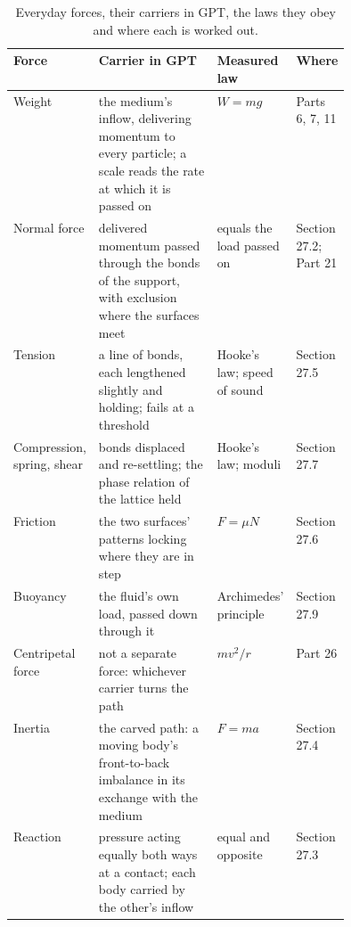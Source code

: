 \documentclass[11pt,a4paper]{article}
\begin{document}
\begin{table}[t]\centering\small
\caption{Everyday forces, their carriers in GPT, the laws they obey and where each is worked out.}
\begin{tabularx}{\linewidth}{@{}>{\raggedright}p{0.15\linewidth} X >{\raggedright}p{0.16\linewidth} >{\raggedright\arraybackslash}p{0.13\linewidth}@{}}\toprule
\textbf{Force} & \textbf{Carrier in GPT} & \textbf{Measured law} & \textbf{Where}\\\midrule
Weight & the medium's inflow, delivering momentum to every particle; a scale reads the rate at which it is passed on & $W=mg$ & Parts 6, 7, 11\\
Normal force & delivered momentum passed through the bonds of the support, with exclusion where the surfaces meet & equals the load passed on & Section 27.2; Part 21\\
Tension & a line of bonds, each lengthened slightly and holding; fails at a threshold & Hooke's law; speed of sound & Section 27.5\\
Compression, spring, shear & bonds displaced and re-settling; the phase relation of the lattice held & Hooke's law; moduli & Section 27.7\\
Friction & the two surfaces' patterns locking where they are in step & $F=\mu N$ & Section 27.6\\
Buoyancy & the fluid's own load, passed down through it & Archimedes' principle & Section 27.9\\
Centripetal force & not a separate force: whichever carrier turns the path & $mv^2/r$ & Part 26\\
Inertia & the carved path: a moving body's front-to-back imbalance in its exchange with the medium & $F=ma$ & Section 27.4\\
Reaction & pressure acting equally both ways at a contact; each body carried by the other's inflow & equal and opposite & Section 27.3\\\bottomrule
\end{tabularx}\label{tab:carriers}\end{table}
\end{document}
